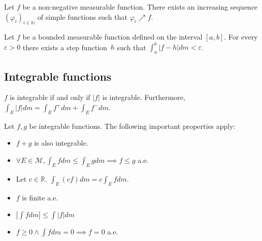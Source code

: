         \begin{theorem}
			Let $f$ be a non-negative measurable function. There exists an increasing sequence $(\varphi_i)_{i\in\mathbb{N}}$ of simple functions such that $\varphi_i\nearrow f$.
		\end{theorem}
        \begin{theorem}
			Let $f$ be a bounded measurable function defined on the interval $[a,b]$. For every $\varepsilon>0$ there exists a step function\footnotemark\ $h$ such that $\int_a^b|f-h|dm<\varepsilon$.
		\end{theorem}
        

\subsection{Integrable functions}
        
        \begin{theorem}
			$f$ is integrable if and only if $|f|$ is integrable. Furthermore, $\int_E|f|dm = \int_E f^+dm + \int_E f^-dm$.
		\end{theorem}
        \begin{property}
			Let $f,g$ be integrable functions. The following important properties apply:
            \begin{itemize}
				\item $f+g$ is also integrable.
                \item $\forall E\in\mathcal{M}, \int_Efdm\leq\int_Egdm\implies f\leq g$ a.e.
                \item Let $c\in\mathbb{R}$. $\int_E(cf)dm = c\int_Efdm$.
                \item $f$ is finite a.e.
                \item $|\int fdm|\leq\int|f|dm$
                \item $f\geq0\land\int fdm=0\implies f=0$ a.e.
			\end{itemize}
		\end{property}
        
